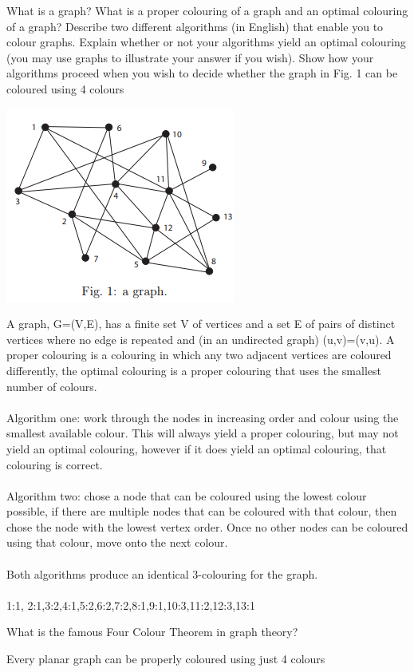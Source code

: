 \documentclass{exam}
\begin{document}
\begin{questions}
\question[20]What is a graph? What is a proper colouring of a graph and an optimal
colouring of a graph? Describe two different algorithms (in English)
that enable you to colour graphs. Explain whether or not your
algorithms yield an optimal colouring (you may use graphs to illustrate
your answer if you wish). Show how your algorithms proceed when you
wish to decide whether the graph in Fig. 1 can be coloured using 4
colours
	\begin{center}
	\includegraphics[scale=0.7]{graph}
\end{center}
\begin{solution}[2in]
A graph, G=(V,E), has a finite set V of vertices and a set E of pairs of
distinct vertices where no edge is repeated and (in an undirected
graph) (u,v)=(v,u). A proper colouring is a colouring in which any two
adjacent vertices are coloured differently, the optimal colouring is a
proper colouring that uses the smallest number of colours.\\
\\
Algorithm one: work through the nodes in increasing order and
colour using the smallest available colour. This will always yield a
proper colouring, but may not yield an optimal colouring, however if
it does yield an optimal colouring, that colouring is correct.\\
\\
Algorithm two: chose a node that can be coloured using the lowest
colour possible, if there are multiple nodes that can be coloured with
that colour, then chose the node with the lowest vertex order. Once no
other nodes can be coloured using that colour, move onto the next
colour.\\
\\
Both algorithms produce an identical 3-colouring for the graph.\\
\\
1:1, 2:1,3:2,4:1,5:2,6:2,7:2,8:1,9:1,10:3,11:2,12:3,13:1
\end{solution}
\newpage
\question[2]What is the famous Four Colour Theorem in graph theory?
\begin{solution}[2in]
	Every planar graph can be properly coloured using just 4 colours
\end{solution}


\end{questions}
\end{document}
